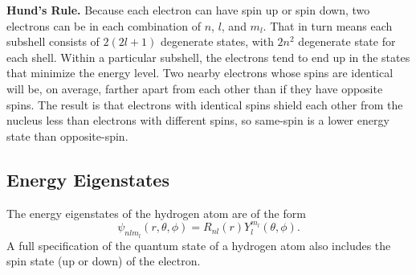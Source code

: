 \documentclass[../../main.tex]{subfiles}
\begin{document}
\textbf{Hund's Rule.} Because each electron can have spin up or spin down, two electrons can be in each
combination of $n$, $l$, and $m_l$. That in turn means each subshell consists of $2(2l + 1)$ degenerate states, with $2n^2$ degenerate state for each shell. Within a particular subshell, the electrons tend to end up in the states that minimize the energy level. Two nearby electrons whose spins are identical will be, on average, farther apart from each other than if they have opposite spins. The result is that electrons with identical spins shield each other from the nucleus less than electrons with different spins, so same-spin is a lower energy state than opposite-spin.

\subsection{Energy Eigenstates}
The energy eigenstates of the hydrogen atom are of the form
\begin{equation*}
    \psi_{nlm_l} (r,\theta,\phi) = R_{nl}(r)Y^{m_l}_l (\theta,\phi).
\end{equation*}
A full specification of the quantum state of a hydrogen atom also includes the spin state (up or down) of the electron.
\end{document}

